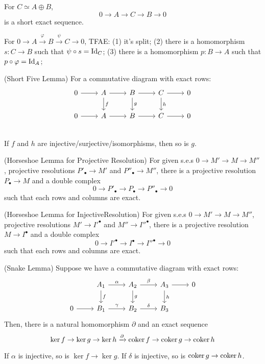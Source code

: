 \documentclass{article}
\begin{document}
\begin{definition}
  For \(C \simeq A \oplus B\),
  \[0 \to A \to C \to B \to 0\]
  is a short exact sequence.
\end{definition}

\begin{theorem}
  For \(0 \to A \xrightarrow{\varphi} B \xrightarrow{\psi} C \to 0\),
  TFAE:
  (1) it's split;
  (2) there is a homomorphism \(s: C \to B\) such that \(\psi \circ s = \textnormal{Id}_C\);
  (3) there is a homomorphism \(p: B \to A\) such that \(p \circ \varphi = \textnormal{Id}_A\);
\end{theorem}

\begin{theorem}(Short Five Lemma)
  For a commutative diagram with exact rows:
  \[\begin{tikzcd}
    0 \ar{r} & A \ar["f"]{d} \ar{r} & B \ar["g"]{d} \ar{r} & C \ar["h"]{d} \ar{r} & 0 \\
    0 \ar{r} & A \ar{r} & B \ar{r} & C \ar{r} & 0 \\
  \end{tikzcd}\]
  If \(f\) and \(h\) are injective/surjective/isomorphisms,
  then so is \(g\).
\end{theorem}

\begin{theorem}(Horseshoe Lemma for Projective Resolution)
  For given s.e.s \(0 \to M' \to M \to M''\),
  projective resolutions \(P'_\bullet \to M'\) and \(P''_\bullet \to M''\),
  there is a projective resolution \(P_\bullet \to M\) and a double complex
  \[0 \to P'_\bullet \to P_\bullet \to P''_\bullet \to 0\]
  such that each rows and columns are exact.
\end{theorem}

\begin{theorem}(Horseshoe Lemma for InjectiveResolution)
  For given s.e.s \(0 \to M' \to M \to M''\),
  projective resolutions \(M' \to I'^\bullet\) and \(M'' \to I''^\bullet\),
  there is a projective resolution \(M \to I^\bullet\) and a double complex
  \[0 \to I'^\bullet \to I^\bullet \to I''^\bullet \to 0\]
  such that each rows and columns are exact.
\end{theorem}

\begin{theorem}(Snake Lemma)
  Suppose we have a commutative diagram with exact rows:
  \[\begin{tikzcd}
    & A_1 \ar["f"]{d} \ar["\alpha"]{r} & A_2 \ar["g"]{d} \ar["\beta"]{r} & A_3 \ar["h"]{d} \ar{r} & 0 \\
    0 \ar{r} & B_1 \ar["\gamma"]{r} & B_2 \ar["\delta"]{r} & B_3
  \end{tikzcd}\]
  Then, there is a natural homomorphism \(\partial\)
  and an exact sequence
  \[\ker f \to \ker g \to \ker h \xrightarrow{\partial} \textnormal{coker}\, f \to \textnormal{coker}\, g \to \textnormal{coker}\, h\]

  If \(\alpha\) is injective, so is \(\ker f \to \ker g\).
  If \(\delta\) is injective, so is \(\textnormal{coker}\, g \to \textnormal{coker}\, h\).
\end{theorem}
\end{document}
